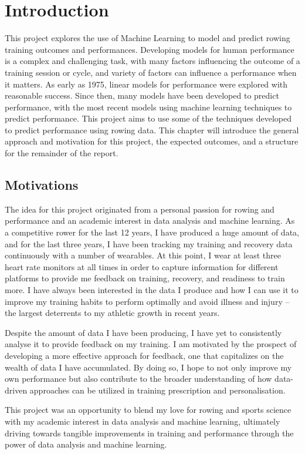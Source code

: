 \chapter{\label{ch:intro}Introduction}
This project explores the use of Machine Learning to model and predict rowing training outcomes and performances. Developing models for human performance is a complex and challenging task, with many factors influencing the outcome of a training session or cycle, and variety of factors can influence a performance when it matters. As early as 1975, linear models for performance were explored with reasonable success. Since then, many models have been developed to predict performance, with the most recent models using machine learning techniques to predict performance. This project aims to use some of the techniques developed to predict performance using rowing data. This chapter will introduce the general approach and motivation for this project, the expected outcomes, and a structure for the remainder of the report.

\section{Motivations}
The idea for this project originated from a personal passion for rowing and performance and an academic interest in data analysis and machine learning. As a competitive rower for the last 12 years, I have produced a huge amount of data, and for the last three years, I have been tracking my training and recovery data continuously with a number of wearables. At this point, I wear at least three heart rate monitors at all times in order to capture information for different platforms to provide me feedback on training, recovery, and readiness to train more. I have always been interested in the data I produce and how I can use it to improve my training habits to perform optimally and avoid illness and injury -- the largest deterrents to my athletic growth in recent years. 

Despite the amount of data I have been producing, I have yet to consistently analyse it to provide feedback on my training. I am motivated by the prospect of developing a more effective approach for feedback, one that capitalizes on the wealth of data I have accumulated. By doing so, I hope to not only improve my own performance but also contribute to the broader understanding of how data-driven approaches can be utilized in training prescription and personalisation.

This project was an opportunity to blend my love for rowing and sports science with my academic interest in data analysis and machine learning, ultimately driving towards tangible improvements in training and performance through the power of data analysis and machine learning.

